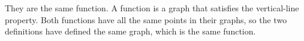 They are the same function. A function is a graph that satisfies the vertical-line property.
Both functions have all the same points in their graphs, so the two definitions
have defined the same graph, which is the same function.
